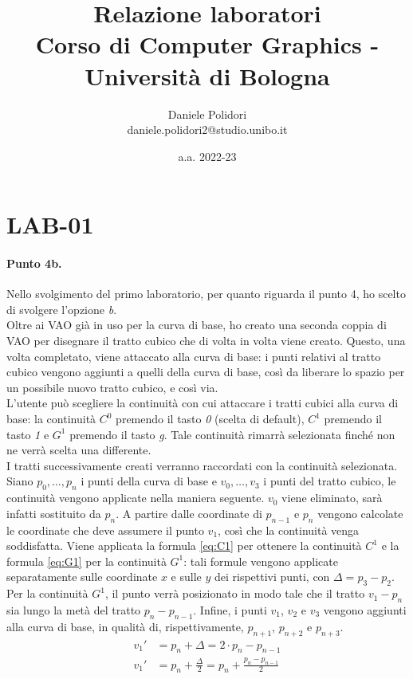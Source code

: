 \documentclass[a4paper, 12pt]{article}
\title{\textbf{Relazione laboratori}\\
        \normalsize Corso di Computer Graphics - Università di Bologna}
\author{Daniele Polidori\\ daniele.polidori2@studio.unibo.it}
\date{a.a. 2022-23}
\begin{document}
\maketitle



\section{LAB-01}

\paragraph{Punto 4b.}
Nello svolgimento del primo laboratorio, per quanto riguarda il punto 4, ho scelto di svolgere l'opzione \textit{b}.\\
Oltre ai VAO già in uso per la curva di base, ho creato una seconda coppia di VAO per disegnare il tratto cubico che di volta in volta viene creato. Questo, una volta completato, viene attaccato alla curva di base: i punti relativi al tratto cubico vengono aggiunti a quelli della curva di base, così da liberare lo spazio per un possibile nuovo tratto cubico, e così via.\\
L'utente può scegliere la continuità con cui attaccare i tratti cubici alla curva di base: la continuità $C^0$ premendo il tasto \textit{0} (scelta di default), $C^1$ premendo il tasto \textit{1} e $G^1$ premendo il tasto \textit{g}. Tale continuità rimarrà selezionata finché non ne verrà scelta una differente.\\
I tratti successivamente creati verranno raccordati con la continuità selezionata. Siano $p_0, \dots, p_n$ i punti della curva di base e $v_0, \dots, v_3$ i punti del tratto cubico, le continuità vengono applicate nella maniera seguente. $v_0$ viene eliminato, sarà infatti sostituito da $p_n$. A partire dalle coordinate di $p_{n-1}$ e $p_n$ vengono calcolate le coordinate che deve assumere il punto $v_1$, così che la continuità venga soddisfatta. Viene applicata la formula \eqref{eq:C1} per ottenere la continuità $C^1$ e la formula \eqref{eq:G1} per la continuità $G^1$: tali formule vengono applicate separatamente sulle coordinate $x$ e sulle $y$ dei rispettivi punti, con $\Delta = p_3 - p_2$. Per la continuità $G^1$, il punto verrà posizionato in modo tale che il tratto $v_1 - p_n$ sia lungo la metà del tratto $p_n - p_{n-1}$. Infine, i punti $v_1$, $v_2$ e $v_3$ vengono aggiunti alla curva di base, in qualità di, rispettivamente, $p_{n+1}$, $p_{n+2}$ e $p_{n+3}$.
\begin{align}
  v_1' &= p_n + \Delta = 2 \cdot p_n - p_{n-1}             \label{eq:C1} \\
  v_1' &= p_n + \frac{\Delta}{2} = p_n + \frac{p_n - p_{n-1}}{2}   \label{eq:G1}
\end{align}
\end{document}

